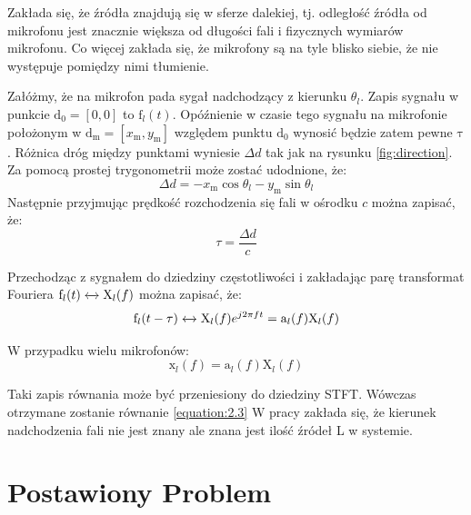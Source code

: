 \noindent Zakłada się, że źródła znajdują się w sferze dalekiej, tj. odległość źródła od mikrofonu jest znacznie większa od długości fali i fizycznych wymiarów mikrofonu. Co więcej zakłada się, że mikrofony są na tyle blisko siebie, że nie występuje pomiędzy nimi tłumienie.

\noindent Załóżmy, że na mikrofon pada sygał nadchodzący z kierunku $\theta_{l}$.
Zapis sygnału w punkcie $\bm{\mathrm{d}}_{0} = [0,0]$ to $\mathrm{f}_{l}(t)$. 
Opóźnienie w czasie tego sygnału na mikrofonie położonym w $\bm{\mathrm{d}}_{\mathrm{m}} = [x_{\mathrm{m}},y_{\mathrm{m}}]$ względem punktu $\bm{\mathrm{d}}_{0}$ wynosić będzie zatem pewne $\mathrm{\tau}$. Różnica dróg między punktami wyniesie $\Delta d$ tak jak na rysunku \ref{fig:direction}. Za pomocą prostej trygonometrii może zostać udodnione, że:
\begin{equation}
    \label{equation:2.4}
    \Delta d = -x_{\mathrm{m}}\cos{\theta_{l}} - y_{\mathrm{m}}\sin{\theta_{l}}
\end{equation}
Następnie przyjmując prędkość rozchodzenia się fali w ośrodku $c$ można zapisać, że:
\begin{equation}
    \label{equation:2.5}
    \tau = \dfrac{\Delta d}{c}
\end{equation}

\noindent Przechodząc z sygnałem do dziedziny częstotliwości i zakładając parę transformat Fouriera $\mathrm{f}_{l}(t)\xleftrightarrow{}\mathrm{X}_{l}(f)$ można zapisać, że:
\begin{equation}
    \label{equation:2.6}
    \mathrm{f}_{l}(t-\tau) \xleftrightarrow{} \mathrm{X}_{l}(f)e^{j 2 \pi f t} =
    \mathrm{a}_{l}(f) \mathrm{X}_{l}(f) 
\end{equation}

\noindent W przypadku wielu mikrofonów:
\begin{equation}
    \label{equation:2.7}
    \bm{\mathrm{x}}_l(f)=
    \bm{\mathrm{a}}_l(f)\mathrm{X}_{l}(f)
\end{equation}


\noindent Taki zapis równania może być przeniesiony do dziedziny STFT. Wówczas otrzymane zostanie równanie \ref{equation:2.3}
\noindent W pracy zakłada się, że kierunek nadchodzenia fali nie jest znany ale znana jest ilość źródeł L w systemie.


\newpage
\section{Postawiony Problem}

